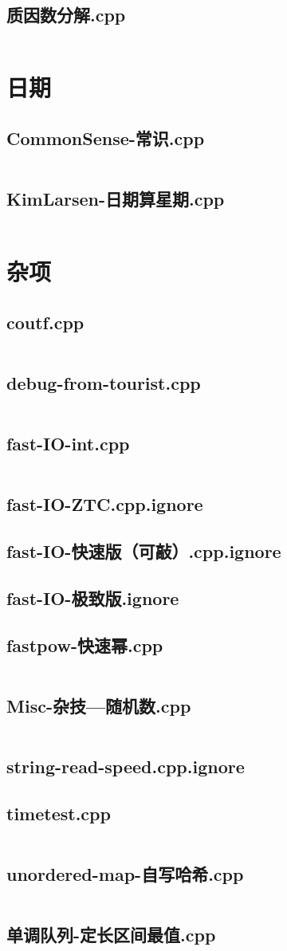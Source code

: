 \documentclass[a4paper,landscape,twocolumn]{article} %
\begin{document}
\subsection{质因数分解.cpp}
\inputminted{c++}{./codes/052}
\section{日期}
\subsection{CommonSense-常识.cpp}
\inputminted{c++}{./codes/053}
\subsection{KimLarsen-日期算星期.cpp}
\inputminted{c++}{./codes/054}
\section{杂项}
\subsection{coutf.cpp}
\inputminted{c++}{./codes/055}
\subsection{debug-from-tourist.cpp}
\inputminted{c++}{./codes/056}
\subsection{fast-IO-int.cpp}
\inputminted{c++}{./codes/057}
\subsection{fast-IO-ZTC.cpp.ignore}
\subsection{fast-IO-快速版（可敲）.cpp.ignore}
\subsection{fast-IO-极致版.ignore}
\subsection{fastpow-快速幂.cpp}
\inputminted{c++}{./codes/061}
\subsection{Misc-杂技---随机数.cpp}
\inputminted{c++}{./codes/062}
\subsection{string-read-speed.cpp.ignore}
\subsection{timetest.cpp}
\inputminted{c++}{./codes/064}
\subsection{unordered-map-自写哈希.cpp}
\inputminted{c++}{./codes/065}
\subsection{单调队列-定长区间最值.cpp}
\inputminted{c++}{./codes/066}
\end{document}
